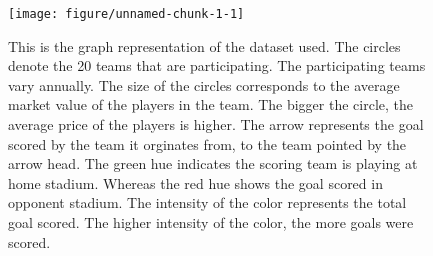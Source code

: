 \documentclass[12pt,a4paper,twoside,openany]{book}
\newenvironment{knitrout}{}{} %
\begin{document}
\begin{figure}[H]
\begin{knitrout}
\color{fgcolor}

{\centering \texttt{[image: figure/unnamed-chunk-1-1]} 

}



\end{knitrout}
\caption [Graph Representation of a Football League]{This is the graph representation of the dataset used. The circles denote the 20 teams that are participating. The participating teams vary annually. The size of the circles corresponds to the average market value of the players in the team. The bigger the circle, the average price of the players is higher. The arrow represents the goal scored by the team it orginates from, to the team pointed by the arrow head. The green hue indicates the scoring team is playing at home stadium. Whereas the red hue shows the goal scored in opponent stadium. The intensity of the color represents the total goal scored. The higher intensity of the color, the more goals were scored.}
\label{fig: EPL}
\end{figure}


\end{document}

